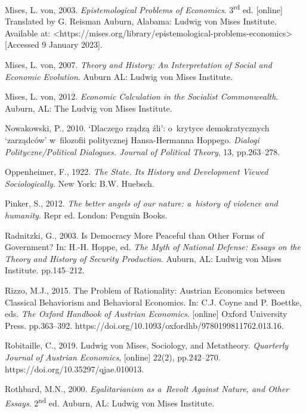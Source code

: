 Mises, L. von, 2003. \textit{Epistemological Problems of Economics}. 3\textsuperscript{rd} ed. [online] Translated by G. Reisman Auburn, Alabama: Ludwig von Mises Institute. Available at: {\textless}https://mises.org/library/epistemological-problems-economics{\textgreater} [Accessed 9 January 2023].



Mises, L. von, 2007. \textit{Theory and History: An Interpretation of Social and Economic Evolution}. Auburn AL: Ludwig von Mises Institute.



Mises, L. von, 2012. \textit{Economic Calculation in the Socialist Commonwealth}. Auburn, AL: The Ludvig von Mises Institute.



Nowakowski, P., 2010. ‘Dlaczego rządzą źli': o~krytyce demokratycznych ‘zarządców' w~filozofii politycznej Hansa-Hermanna Hoppego. \textit{Dialogi Polityczne/Political Dialogues. Journal of Political Theory}, 13, pp.263–278.



Oppenheimer, F., 1922. \textit{The State. Its History and Development Viewed Sociologically}. New York: B.W. Huebsch.



Pinker, S., 2012. \textit{The better angels of our nature: a~history of violence and humanity}. Repr ed. London: Penguin Books.



Radnitzki, G., 2003. Is Democracy More Peaceful than Other Forms of Government? In: H.-H. Hoppe, ed. \textit{The Myth of National Defense: Essays on the Theory and History of Security Production}. Auburn, AL: Ludwig von Mises Institute. pp.145–212.



Rizzo, M.J., 2015. The Problem of Rationality: Austrian Economics between Classical Behaviorism and Behavioral Economics. In: C.J. Coyne and P. Boettke, eds. \textit{The Oxford Handbook of Austrian Economics}. [online] Oxford University Press. pp.363–392. https://doi.org/10.1093/oxfordhb/9780199811762.013.16.



Robitaille, C., 2019. Ludwig von Mises, Sociology, and Metatheory. \textit{Quarterly Journal of Austrian Economics}, [online] 22(2), pp.242–270. https://doi.org/10.35297/qjae.010013.



Rothbard, M.N., 2000. \textit{Egalitarianism as a~Revolt Against Nature, and Other Essays}. 2\textsuperscript{nd} ed. Auburn, AL: Ludwig von Mises Institute.



